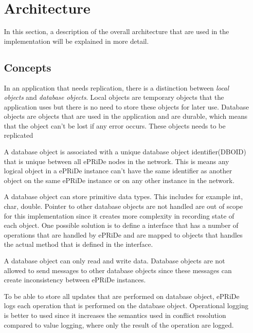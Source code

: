 
\section{Architecture} %
\label{sec:arch}

In this section, a description of the overall architecture that are used in the implementation will be explained in more detail.  


\subsection{Concepts} %
\label{sub:consepts}

In an application that needs replication, there is a distinction between \emph{local objects} and \emph{database objects}. Local objects are temporary objects that the application uses but there is no need to store these objects for later use. Database objects are objects that are used in the application and are durable, which means that the object can't be lost if any error occurs. These objects needs to be replicated 

A database object is associated with a unique database object identifier(DBOID) that is unique between all ePRiDe nodes in the network. This is means any logical object in a ePRiDe instance can't have the same identifier as another object on the same ePRiDe instance or on any other instance in the network.    

A database object can store primitive data types. This includes for example int, char, double. Pointer to other database objects are not handled are out of scope for this implementation since it creates more complexity in recording state of each object. One possible solution is to define a interface that has a number of operations that are handled by ePRiDe and are mapped to objects that handles the actual method that is defined in the interface.    

A database object can only read and write data. Database objects are not allowed to send messages to other database objects since these messages can create inconsistency between ePRiDe instances.

To be able to store all updates that are performed on database object, ePRiDe logs each operation that is performed on the database object. Operational logging is better to used since it increases the semantics used in conflict resolution compared to value logging, where only the result of the operation are logged. 

